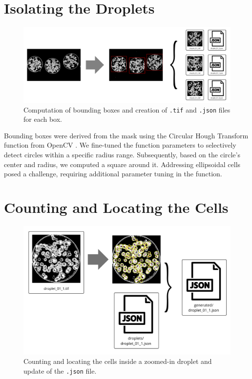 \documentclass[12pt]{beamer}
\begin{document}
\begin{frame}[t]
\begin{multicols}{3}
\section{Isolating the Droplets}
    \begin{figure}[H]
        \centering
        \includegraphics[width=.9\linewidth]{figs/section2.png}
        \caption{Computation of bounding boxes and creation of \texttt{.tif} and \texttt{.json} files for each box.}
        \label{fig:droplets}
    \end{figure}
Bounding boxes were derived from the mask using the Circular Hough Transform function from OpenCV \cite{cv2}. We fine-tuned the function parameters to selectively detect circles within a specific radius range. Subsequently, based on the circle's center and radius, we computed a square around it. Addressing ellipsoidal cells posed a challenge, requiring additional parameter tuning in the function.

\section{Counting and Locating the Cells}
    \begin{figure}[H]
        \centering
        \includegraphics[width=.8\linewidth]{figs/section3.png}
        \caption{Counting and locating the cells inside a zoomed-in droplet and update of the \texttt{.json} file.}
        \label{fig:count}
    \end{figure}


\end{multicols}
\end{frame}
\end{document}

